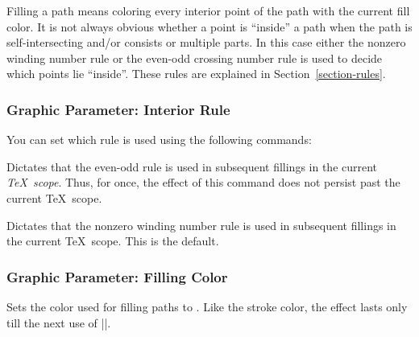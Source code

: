 Filling a path means coloring every interior point of the path with the current
fill color. It is not always obvious whether a point is ``inside'' a  path when
the path is self-intersecting and/or consists or multiple parts. In this case
either the nonzero winding number rule or the even-odd crossing number rule is
used to decide which points lie ``inside''. These rules are explained in
Section~\ref{section-rules}.


\subsubsection{Graphic Parameter: Interior Rule}

You can set which rule is used using the following commands:

\begin{command}{\pgfseteorule}
    Dictates that the even-odd rule is used in subsequent fillings in the
    current \emph{\TeX\ scope}. Thus, for once, the effect of this command does
    not persist past the current \TeX\ scope.
\begin{codeexample}[]
\begin{pgfpicture}
  \pgfseteorule
  \pgfpathcircle{\pgfpoint{0mm}{0cm}}{7mm}
  \pgfpathcircle{\pgfpoint{5mm}{0cm}}{7mm}
\end{pgfpicture}
\end{codeexample}
\end{command}

\begin{command}{\pgfsetnonzerorule}
    Dictates that the nonzero winding number rule is used in subsequent
    fillings in the current \TeX\ scope. This is the default.
\begin{codeexample}[]
\begin{pgfpicture}
  \pgfsetnonzerorule
  \pgfpathcircle{\pgfpoint{0mm}{0cm}}{7mm}
  \pgfpathcircle{\pgfpoint{5mm}{0cm}}{7mm}
\end{pgfpicture}
\end{codeexample}
\end{command}


\subsubsection{Graphic Parameter: Filling Color}

\begin{command}{\pgfsetfillcolor{}}
    Sets the color used for filling paths to . Like the stroke
    color, the effect lasts only till the next use of |\color|.
\end{command}


